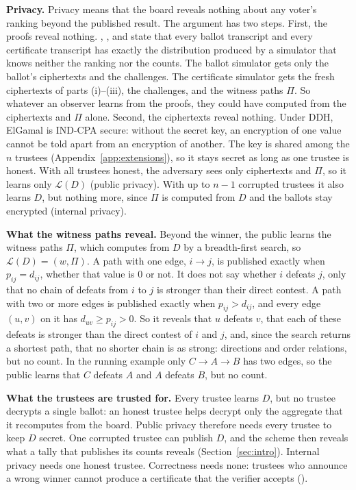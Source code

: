 \textbf{Privacy.} Privacy means that the board reveals nothing about any
voter's ranking beyond the published result. The argument has two steps.
First, the proofs reveal nothing. , ,
and  state that every ballot transcript and every
certificate transcript has exactly the distribution produced by a
simulator that knows neither the ranking nor the counts. The ballot
simulator gets only the ballot's ciphertexts and the challenges. The
certificate simulator gets the fresh ciphertexts of parts (i)--(iii), the
challenges, and the witness paths $\Pi$. So whatever an observer learns
from the proofs, they could have computed from the ciphertexts and $\Pi$
alone. Second, the ciphertexts reveal nothing. Under DDH, ElGamal is
IND-CPA secure: without the secret key, an encryption of one value cannot
be told apart from an encryption of another. The key is shared among the
$n$ trustees (Appendix~\ref{app:extensions}), so it stays secret as long
as one trustee is honest. With all trustees honest, the adversary sees
only ciphertexts and $\Pi$, so it learns only $\mathcal{L}(D)$ (public
privacy). With up to $n - 1$ corrupted trustees it also learns $D$, but
nothing more, since $\Pi$ is computed from $D$ and the ballots stay
encrypted (internal privacy).

\textbf{What the witness paths reveal.} Beyond the winner, the public
learns the witness paths $\Pi$, which  computes from
$D$ by a breadth-first search, so $\mathcal{L}(D) = (w, \Pi)$. A path
with one edge, $i \to j$, is published exactly when $p_{ij} = d_{ij}$,
whether that value is $0$ or not. It does not say whether $i$ defeats
$j$, only that no chain of defeats from $i$ to $j$ is stronger than
their direct contest. A path with two or more edges is published exactly
when $p_{ij} > d_{ij}$, and every edge $(u, v)$ on it has $d_{uv} \ge
p_{ij} > 0$. So it reveals that $u$ defeats $v$, that each of these
defeats is stronger than the direct contest of $i$ and $j$, and, since
the search returns a shortest path, that no shorter chain is as strong:
directions and order relations, but no count. In the running example
only $C \to A \to B$ has two edges, so the public learns that $C$ defeats
$A$ and $A$ defeats $B$, but no count. 

\textbf{What the trustees are trusted for.} Every trustee learns $D$,
but no trustee decrypts a single ballot: an honest trustee helps decrypt
only the aggregate that it recomputes from the board. Public privacy
therefore needs every trustee to keep $D$ secret. One corrupted trustee
can publish $D$, and the scheme then reveals what a tally that publishes
its counts reveals (Section~\ref{sec:intro}). Internal privacy needs one
honest trustee. Correctness needs none: trustees who announce a wrong
winner cannot produce a certificate that the verifier accepts
().
